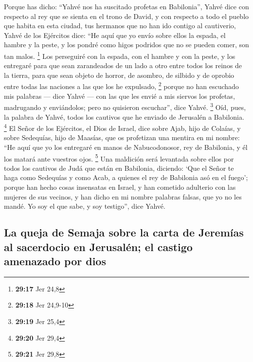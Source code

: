 \begin{paracol}{2}
 Porque has dicho: ``Yahvé nos ha suscitado profetas en
Babilonia'',  Yahvé dice con respecto al rey que se
sienta en el trono de David, y con respecto a todo el pueblo que habita
en esta ciudad, tus hermanos que no han ido contigo al cautiverio,
 Yahvé de los Ejércitos dice: ``He aquí que yo envío
sobre ellos la espada, el hambre y la peste, y los pondré como higos
podridos que no se pueden comer, son tan malos. \footnote{\textbf{29:17}
  Jer 24,8}  Los perseguiré con la espada, con el hambre
y con la peste, y los entregaré para que sean zarandeados de un lado a
otro entre todos los reinos de la tierra, para que sean objeto de
horror, de asombro, de silbido y de oprobio entre todas las naciones a
las que los he expulsado, \footnote{\textbf{29:18} Jer 24,9-10}
 porque no han escuchado mis palabras --- dice Yahvé ---
con las que les envié a mis siervos los profetas, madrugando y
enviándolos; pero no quisieron escuchar'', dice Yahvé. \footnote{\textbf{29:19}
  Jer 25,4}  Oíd, pues, la palabra de Yahvé, todos los
cautivos que he enviado de Jerusalén a Babilonia. \footnote{\textbf{29:20}
  Jer 29,4}  El Señor de los Ejércitos, el Dios de
Israel, dice sobre Ajab, hijo de Colaías, y sobre Sedequías, hijo de
Maasías, que os profetizan una mentira en mi nombre: ``He aquí que yo
los entregaré en manos de Nabucodonosor, rey de Babilonia, y él los
matará ante vuestros ojos. \footnote{\textbf{29:21} Jer 29,8}
 Una maldición será levantada sobre ellos por todos los
cautivos de Judá que están en Babilonia, diciendo: `Que el Señor te haga
como Sedequías y como Acab, a quienes el rey de Babilonia asó en el
fuego';  porque han hecho cosas insensatas en Israel, y
han cometido adulterio con las mujeres de sus vecinos, y han dicho en mi
nombre palabras falsas, que yo no les mandé. Yo soy el que sabe, y soy
testigo'', dice Yahvé.

\hypertarget{la-queja-de-semaja-sobre-la-carta-de-jeremuxedas-al-sacerdocio-en-jerusaluxe9n-el-castigo-amenazado-por-dios}{%
\subsection{La queja de Semaja sobre la carta de Jeremías al sacerdocio
en Jerusalén; el castigo amenazado por
dios}\label{la-queja-de-semaja-sobre-la-carta-de-jeremuxedas-al-sacerdocio-en-jerusaluxe9n-el-castigo-amenazado-por-dios}}


\end{paracol}
